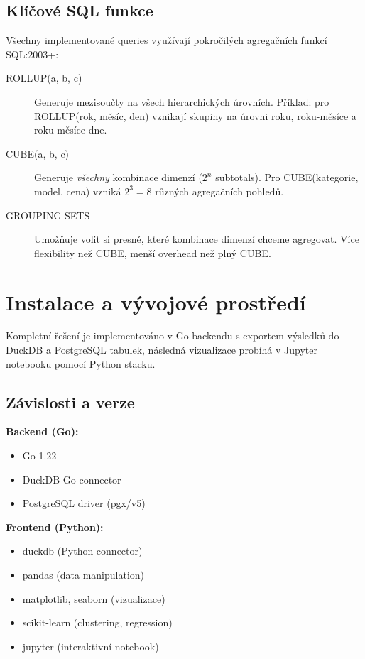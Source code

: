 \documentclass[12pt,a4paper]{article}
\begin{document}
\subsection{Klíčové SQL funkce}

Všechny implementované queries využívají pokročilých agregačních funkcí SQL:2003+:

\begin{description}
    \item[ROLLUP(a, b, c)] Generuje mezisoučty na všech hierarchických úrovních.
          Příklad: pro ROLLUP(rok, měsíc, den) vznikají skupiny na úrovni roku, roku-měsíce a roku-měsíce-dne.
    
    \item[CUBE(a, b, c)] Generuje \textit{všechny} kombinace dimenzí ($2^n$ subtotals).
          Pro CUBE(kategorie, model, cena) vzniká $2^3 = 8$ různých agregačních pohledů.
    
    \item[GROUPING SETS] Umožňuje volit si presně, které kombinace dimenzí chceme agregovat.
          Více flexibility než CUBE, menší overhead než plný CUBE.
\end{description}

\newpage

\section{Instalace a vývojové prostředí}

Kompletní řešení je implementováno v Go backendu s exportem výsledků do DuckDB a PostgreSQL tabulek,
následná vizualizace probíhá v Jupyter notebooku pomocí Python stacku.

\subsection{Závislosti a verze}

\textbf{Backend (Go):}
\begin{itemize}
    \item Go 1.22+
    \item DuckDB Go connector
    \item PostgreSQL driver (pgx/v5)
\end{itemize}

\textbf{Frontend (Python):}
\begin{itemize}
    \item duckdb (Python connector)
    \item pandas (data manipulation)
    \item matplotlib, seaborn (vizualizace)
    \item scikit-learn (clustering, regression)
    \item jupyter (interaktivní notebook)
\end{itemize}
\end{document}
